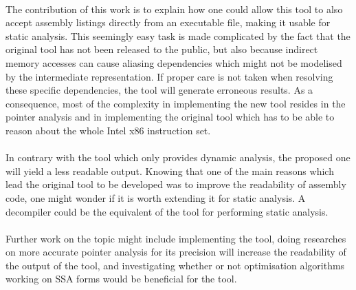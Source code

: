 \paragraph{}
The contribution of this work is to explain how one could allow this tool to also accept assembly listings directly from an executable file, making it usable for static analysis. This seemingly easy task is made complicated by the fact that the original tool has not been released to the public, but also because indirect memory accesses can cause aliasing dependencies which might not be modelised by the intermediate representation. If proper care is not taken when resolving these specific dependencies, the tool will generate erroneous results. As a consequence, most of the complexity in implementing the new tool resides in the pointer analysis and in implementing the original tool which has to be able to reason about the whole Intel x86 instruction set.

\paragraph{}
In contrary with the tool which only provides dynamic analysis, the proposed one will yield a less readable output. Knowing that one of the main reasons which lead the original tool to be developed was to improve the readability of assembly code, one might wonder if it is worth extending it for static analysis. A decompiler could be the equivalent of the tool for performing static analysis.

\paragraph{}
Further work on the topic might include implementing the tool, doing researches on more accurate pointer analysis for its precision will increase the readability of the output of the tool, and investigating whether or not optimisation algorithms working on SSA forms would be beneficial for the tool.





 